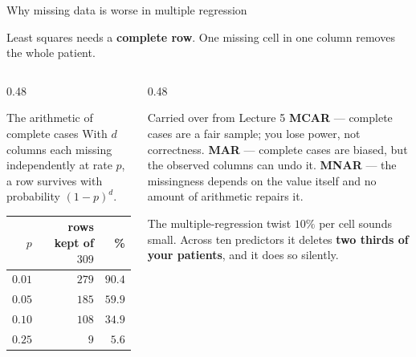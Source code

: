 \documentclass[aspectratio=169]{beamer}
\begin{document}
\begin{frame}[shrink=6]{Why missing data is worse in multiple regression}
  \begin{alertblock}{}
    \centering
    Least squares needs a \textbf{complete row}. One missing cell in one
    column removes the whole patient.
  \end{alertblock}
  \vspace{0.3em}
  \begin{columns}[T]
    \begin{column}{0.48\textwidth}
      \begin{block}{The arithmetic of complete cases}
        With $d$ columns each missing independently at rate $p$, a row
        survives with probability $(1-p)^d$.
        \begin{center}\small
        \begin{tabular}{@{}rrr@{}}
          \toprule
          $p$ & rows kept of $309$ & \%\\
          \midrule
          $0.01$ & $279$ & $90.4$\\
          $0.05$ & $185$ & $59.9$\\
          $0.10$ & $108$ & $34.9$\\
          $0.25$ & $\phantom{00}9$ & $\phantom{0}5.6$\\
          \bottomrule
        \end{tabular}
        \end{center}
      \end{block}
    \end{column}
    \begin{column}{0.48\textwidth}
      \begin{block}{Carried over from Lecture 5}
        \small \textbf{MCAR} --- complete cases are a fair sample; you lose
        power, not correctness. \textbf{MAR} --- complete cases are biased,
        but the observed columns can undo it. \textbf{MNAR} --- the
        missingness depends on the value itself and no amount of arithmetic
        repairs it.
      \end{block}
      \begin{alertblock}{The multiple-regression twist}
        \small $10\%$ per cell sounds small. Across ten predictors it deletes
        \textbf{two thirds of your patients}, and it does so silently.
      \end{alertblock}
    \end{column}
  \end{columns}
\end{frame}
\end{document}

